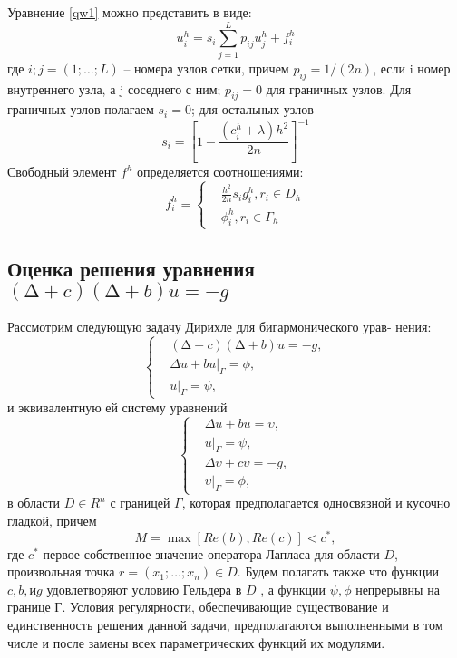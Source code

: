 Уравнение \ref{qw1} можно представить в виде:
\begin{equation}
u^{h}_{i}=s_{i}\sum^{L}_{j=1}{p_{ij}u^{h}_{j}+f^{h}_{i}}
	\label{qw2}
\end{equation} 
где $i; j = (1; \dots; L)$ --  номера узлов сетки, причем $p_{ij} = 1/(2n)$, если i 
номер внутреннего узла, а j  соседнего с ним; $p_{ij} = 0$ для граничных
узлов. Для граничных узлов полагаем $s_{i} = 0$; для остальных узлов
\begin{equation}
s_{i}= 
	\left[
1-\frac{(c^{h}_{i}+\lambda)h^{2}}{2n}
 \right]^{-1} 
	\label{qw3}
\end{equation}
Свободный элемент $f^{h}$ определяется соотношениями:
\begin{equation} f^{h}_{i}= 
	\left\{
\begin{aligned}
& \frac{h^{2}}{2n}s_{i}g^{h}_{i}, r_{i} \in D_{h}\\ & \phi^{h}_{i}, r_{i} \in \Gamma_{h}
\end{aligned}
 \right. \label{qw4}\end{equation}
\subsection{Оценка решения уравнения $(∆ + c)(∆ + b)u = -g$}
Рассмотрим следующую задачу Дирихле для бигармонического урав-
нения: 
\begin{equation} 
	\left\{
\begin{aligned}
& (∆ + c)(∆ + b)u = -g,\\ & \Delta u + bu|_{\Gamma} = \phi, \\ & u|_{\Gamma} = \psi, 
\end{aligned}
 \right. \label{qw5}\end{equation}
и эквивалентную ей систему уравнений
\begin{equation} 
	\left\{
\begin{aligned}
&\Delta u + bu =\upsilon, \\ & u|_{\Gamma} = \psi, \\  &\Delta \upsilon + c\upsilon =-g,
\\  & \upsilon|_{\Gamma} = \phi, 
\end{aligned}
 \right. \label{qw6}
\end{equation}
в области $D\in R^{n}$ с границей $\Gamma$, которая предполагается односвязной и
кусочно гладкой, причем 
\begin{equation}
	M=\max{[Re(b),Re(c)]} < c^{*},
\end{equation}
где $c^{*}$ первое собственное значение оператора Лапласа для области $D$, произвольная точка $ r = (x_{1}; \dots; x_{n}) \in D$. Будем полагать также что функции $c, b, и g $ удовлетворяют условию Гельдера в $D$ , а функции $ \psi, \phi$ непрерывны на границе Г. Условия регулярности, обеспечивающие существование и единственность решения данной задачи, предполагаются выполненными в том числе и после замены всех параметрических функций их модулями.


